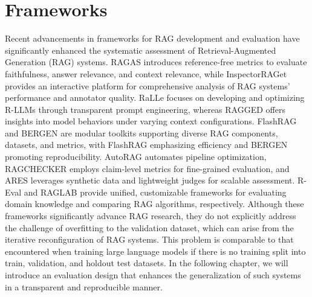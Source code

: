 \section{Frameworks}
Recent advancements in frameworks for RAG development and evaluation have significantly enhanced the systematic assessment of Retrieval-Augmented Generation (RAG) systems. RAGAS \cite{Es.2023} introduces reference-free metrics to evaluate faithfulness, answer relevance, and context relevance, while InspectorRAGet \cite{Fadnis.26.04.2024} provides an interactive platform for comprehensive analysis of RAG systems' performance and annotator quality. RaLLe \cite{Hoshi.8212023b} focuses on developing and optimizing R-LLMs through transparent prompt engineering, whereas RAGGED \cite{JenniferHsia.2024} offers insights into model behaviors under varying context configurations. FlashRAG \cite{Jin.5222024} and BERGEN \cite{Rau.01.07.2024} are modular toolkits supporting diverse RAG components, datasets, and metrics, with FlashRAG emphasizing efficiency and BERGEN promoting reproducibility. AutoRAG \cite{Kim.10282024} automates pipeline optimization, RAGCHECKER \cite{Ru.15.08.2024} employs claim-level metrics for fine-grained evaluation, and ARES \cite{SaadFalcon.16.11.2023} leverages synthetic data and lightweight judges for scalable assessment. R-Eval \cite{Tu.2024} and RAGLAB \cite{Zhang.8212024} provide unified, customizable frameworks for evaluating domain knowledge and comparing RAG algorithms, respectively. Although these frameworks significantly advance RAG research, they do not explicitly address the challenge of overfitting to the validation dataset, which can arise from the iterative reconfiguration of RAG systems. This problem is comparable to that encountered when training large language models if there is no training split into train, validation, and holdout test datasets. In the following chapter, we will introduce an evaluation design that enhances the generalization of such systems in a transparent and reproducible manner.
